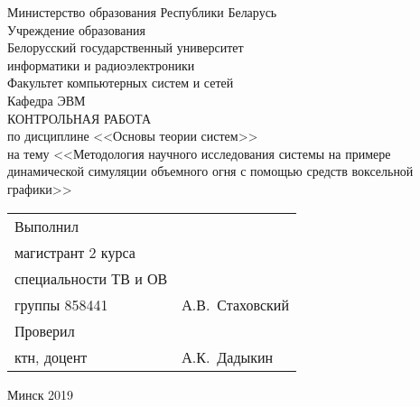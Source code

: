 \begin{titlepage}
  \begin{center}
    Министерство образования Республики Беларусь \\[1em]
    Учреждение образования \\
    Белорусский государственный университет \\
    информатики и радиоэлектроники \\[2em]

    Факультет компьютерных систем и сетей \\ [1em]
    Кафедра ЭВМ \\[6em]

    {КОНТРОЛЬНАЯ РАБОТА}\\
    {по дисциплине <<Основы теории систем>>}\\
    {на тему <<Методология научного исследования системы на примере
      динамической симуляции объемного огня с помощью средств воксельной
      графики>>}\\[8em]


	  \begin{tabular}{>{\raggedright}p{}p{} }
      Выполнил & \\
      магистрант 2 курса & \\
      специальности ТВ и ОВ & \\
      группы 858441 \hrulefill& А.В.~Стаховский \\[2em]
      Проверил & \\
      ктн, доцент \hrulefill& А.К.~Дадыкин
    \end{tabular}

    \vfill
    {\normalsize Минск 2019}
  \end{center}
\end{titlepage}
